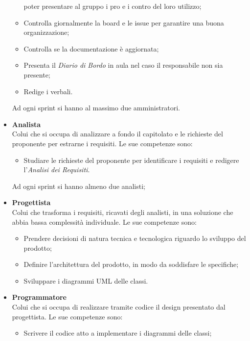 \begin{itemize}
\begin{itemize}
                    poter presentare al gruppo i pro e i contro del loro utilizzo;
              \item Controlla giornalmente la board e le issue per garantire una buona
                    organizzazione;
              \item Controlla se la documentazione è aggiornata;
              \item Presenta il \textit{Diario di Bordo} in aula nel caso il responsabile non sia
                    presente;
              \item Redige i verbali.
          \end{itemize}
          Ad ogni sprint si hanno al massimo due amministratori.
    \item \textbf{Analista}\\
          Colui che si occupa di analizzare a fondo il capitolato e le richieste del proponente per estrarne i requisiti.
          Le sue competenze sono:
          \begin{itemize}
              \item Studiare le richieste del proponente per identificare i requisiti e redigere
                    l'\textit{Analisi dei Requisiti}.
          \end{itemize}
          Ad ogni sprint si hanno almeno due analisti;
    \item \textbf{Progettista}\\
          Colui che trasforma i requisiti, ricavati degli analisti, in una soluzione che abbia bassa complessità individuale.
          Le sue competenze sono:
          \begin{itemize}
              \item Prendere decisioni di natura tecnica e tecnologica riguardo lo sviluppo del
                    prodotto;
              \item Definire l'architettura del prodotto, in modo da soddisfare le specifiche;
              \item Sviluppare i diagrammi UML delle classi.
          \end{itemize}
    \item \textbf{Programmatore}\\
          Colui che si occupa di realizzare tramite codice il design presentato dal progettista.
          Le sue competenze sono:
          \begin{itemize}
              \item Scrivere il codice atto a implementare i diagrammi delle classi;

\end{itemize}
\end{itemize}
